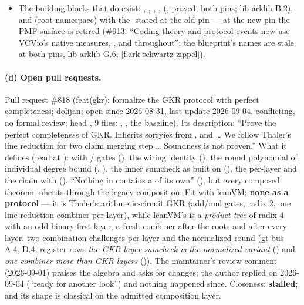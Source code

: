 \begin{itemize}
\item The building blocks that do exist: , ,
  , , 
  (, proved, both pins; lib-arklib B.2), and
   (root namespace) with the -stated
   at the old pin --- at the new pin the PMF surface is retired
  (\#913: ``Coding-theory and protocol events now use VCVio's native measures, ,
  and  throughout''; the blueprint's  names are stale
  at both pins, lib-arklib G.6; \cref{f:ark-schwartz-zippel}).
\end{itemize}

\paragraph{(d) Open pull requests.}
Pull request \#818 (feat(gkr): formalize the GKR protocol with perfect completeness; dolijan;
open since 2026-08-31, last update 2026-09-04, conflicting, no formal review; head
, 9 files: ,
, the baseline). Its description: ``Prove the
perfect completeness of GKR. Inherits sorryies from ,
 and  \ldots{} We follow
Thaler's line reduction for two claim merging step \ldots{} Soundness is not proven.'' What it
defines (read at ):  with /
gates (), the wiring identity 
(), the round polynomial of individual degree bound
(, ), the inner sumcheck as
 built on  (), the per-layer
 and the chain  with
 (). ``Nothing in
 contains a  of its own'' (),
but every composed theorem inherits  through the legacy composition. Fit with
leanVM: \textbf{none as a protocol} --- it is Thaler's arithmetic-circuit GKR (add/mul gates,
radix 2, one line-reduction combiner per layer), while leanVM's is a \emph{product tree} of
radix 4 with an odd binary first layer, a fresh combiner after the roots and after every layer,
two combination challenges per layer and the normalized round (gt-bus A.4, D.4; register rows
\emph{the GKR layer sumcheck is the normalized variant} () and \emph{one combiner more
than GKR layers} ()). The maintainer's review comment (2026-09-01) praises the algebra
and asks for changes; the author replied on 2026-09-04 (``ready for another look'') and nothing
happened since. Closeness: \textbf{stalled}; and its shape is classical 
on the admitted composition layer.

